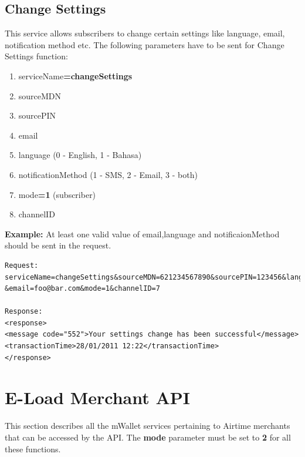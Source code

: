 \documentclass[11pt,titlepage]{article}
\begin{document}
\subsection{Change Settings}
This service allows subscribers to change certain settings like language, email, notification method etc. 
The following parameters have to be sent for Change Settings function:
\begin{enumerate}
\item serviceName\textbf{=changeSettings}
\item sourceMDN
\item sourcePIN
\item email
\item language (0 - English, 1 - Bahasa)
\item notificationMethod (1 - SMS, 2 - Email, 3 - both)
\item mode\textbf{=1} (subscriber)
\item channelID
\end{enumerate}
\textbf{Example:}
At least one valid value of email,language and notificaionMethod should be sent in the request.
\begin{verbatim}
Request:
serviceName=changeSettings&sourceMDN=621234567890&sourcePIN=123456&language=0
&email=foo@bar.com&mode=1&channelID=7

Response:
<response>
<message code="552">Your settings change has been successful</message>
<transactionTime>28/01/2011 12:22</transactionTime>
</response>
\end{verbatim}


\section{E-Load Merchant API}
This section describes all the mWallet services pertaining to Airtime merchants that can be accessed by the API. The {\bf mode} parameter must be set to {\bf 2} for all these functions.
\end{document}
